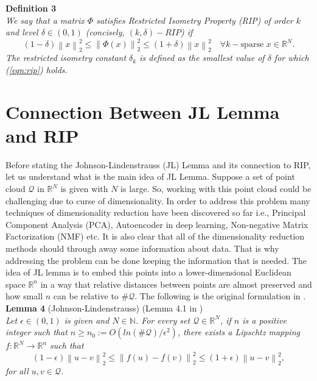 \documentclass[twoside,11pt]{article}
\newcommand\norm[1]{\left\lVert#1\right\rVert}
\begin{document}
\noindent
{\bf Definition 3} \\
{\it
We say that a matrix $\Phi$ satisfies Restricted Isometry Property (RIP) of order $k$ and level $\delta \in (0, 1)$ (concisely, $(k, \delta)-RIP$) if 
\begin{equation}
\label{eqn:rip}
    (1-\delta) \norm{x}_2^2 \leq \norm{\Phi(x)}_2^2 \leq (1+\delta) \norm{x}_2^2 \quad \forall k-\text{sparse } x \in \mathbb{R}^N.
\end{equation}
The restricted isometry constant $\delta_k$ is defined as the smallest value of $\delta$ for which (\ref{eqn:rip}) holds.
}

\section{Connection Between JL Lemma and RIP}
Before stating the Johnson-Lindenstrauss (JL) Lemma and its connection to RIP, let us understand what is the main idea of JL Lemma. Suppose a set of point cloud $\mathcal{Q}$ in $\mathbb{R}^N$ is given with $N$ is large. So, working with this point cloud could be challenging due to curse of dimensionality. In order to address this problem many techniques of dimensionality reduction have been discovered so far i.e., Principal Component Analysis (PCA), Autoencoder in deep learning, Non-negative Matrix Factorization (NMF) etc. It is also clear that all of the dimensionality reduction methods should through away some information about data. That is why addressing the problem can be done keeping the information that is needed. The idea of JL lemma is to embed this points into a lower-dimensional Euclidean space $\mathbb{R}^n$ in a way that relative distances between points are almost preserved and how small $n$ can be relative to $\#\mathcal{Q}$. The following is the original formulation in \citep{jl}. \\

\noindent
{\bf Lemma 4} (Johnson-Lindenstrauss) (Lemma 4.1 in \citep{isometry}) \\
{\it
Let $\epsilon \in (0, 1)$ is given and $N \in \mathbb{N}$. For every set $\mathcal{Q} \in \mathbb{R}^N$, if $n$ is a positive integer such that $n \ge n_0 := O(ln(\#\mathcal{Q})/\epsilon^2)$, there exists a Lipschtz mapping $f : \mathbb{R}^N \rightarrow \mathbb{R}^n$ such that 
\begin{equation}
\label{eqn:jl}
(1 - \epsilon) \norm{u - v}_2^2 \leq \norm{f(u) - f(v)}_2^2 \leq (1 + \epsilon) \norm{u - v}_2^2,
\end{equation}
for all $u, v \in \mathcal{Q}$.
}\\
\end{document}
